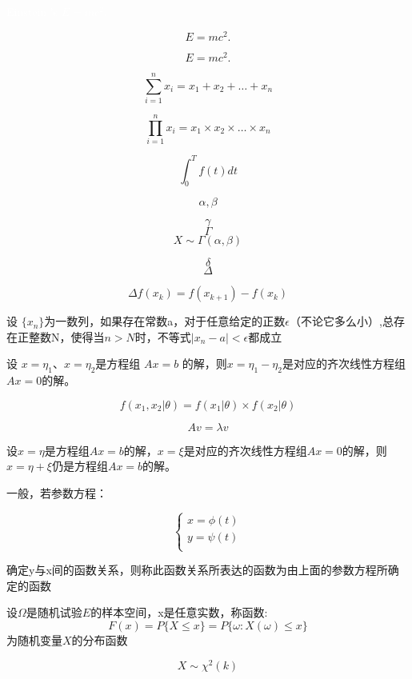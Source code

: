 \documentclass[UTF8,12pt]{ctexart}
\begin{document}
\textcolor{white}{\LARGE Einstein 's $E=mc^2$.}

\[ E=mc^2. \]

\begin{equation}
E=mc^2.
\end{equation}

\[ \sum\limits_{i = 1}^{n} x_i = x_1 + x_2 + \dots + x_n\]

\[ \prod\limits_{i = 1}^{n} x_i = x_1 \times x_2 \times \dots \times x_n\]

\[ \int_{0}^{T}f(t)dt\]

\[ \alpha,\beta \]

\[ \gamma \]
\[ \Gamma \]
\[ X \sim \Gamma (\alpha,\beta) \]

\[ \delta \]
\[ \Delta \]

\[ \Delta f(x_k) = f(x_{k+1}) - f(x_k) \]


设 $\{x_n\}$为一数列，如果存在常数a，对于任意给定的正数$\epsilon$（不论它多么小）,总存在正整数N，使得当$n > N$时，不等式$\left| x_n - a \right| < \epsilon$都成立


设 $x=\eta_1$、$x=\eta_2$是方程组 $Ax=b$ 的解，则$x=\eta_1 - \eta_2$是对应的齐次线性方程组$Ax=0$的解。

\[ f(x_1,x_2 | \theta) = f(x_1 | \theta) \times f(x_2 | \theta)\]

\[ Av = \lambda v \]

设$x=\eta$是方程组$Ax=b$的解，$x=\xi$是对应的齐次线性方程组$Ax=0$的解，则$x=\eta + \xi$仍是方程组$Ax=b$的解。

一般，若参数方程：

\[
\begin{cases}
x =  \phi (t) \\
y =  \psi (t) \\
\end{cases}
\]

确定y与x间的函数关系，则称此函数关系所表达的函数为由上面的参数方程所确定的函数


设$\Omega$是随机试验$E$的样本空间，x是任意实数，称函数:
\[F(x)= P\{ X \le x\} = P\{\omega: X(\omega) \le x \}\]为随机变量$X$的分布函数


\[ X \sim \chi^2(k) \]
\end{document}
